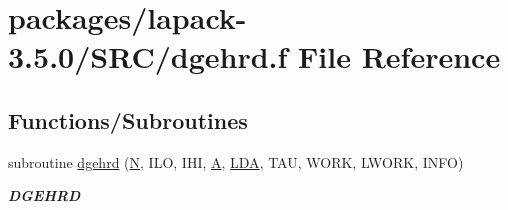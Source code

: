 \hypertarget{dgehrd_8f}{}\section{packages/lapack-\/3.5.0/\+S\+R\+C/dgehrd.f File Reference}
\label{dgehrd_8f}
\subsection*{Functions/\+Subroutines}
\begin{DoxyCompactItemize}
\item 
subroutine \hyperlink{group__doubleGEcomputational_ga2611cc9dfdc84e2a08ec57a5dd6cdd2e}{dgehrd} (\hyperlink{polmisc_8c_a0240ac851181b84ac374872dc5434ee4}{N}, I\+L\+O, I\+H\+I, \hyperlink{classA}{A}, \hyperlink{example__user_8c_ae946da542ce0db94dced19b2ecefd1aa}{L\+D\+A}, T\+A\+U, W\+O\+R\+K, L\+W\+O\+R\+K, I\+N\+F\+O)
\begin{DoxyCompactList}\small\item\em {\bfseries D\+G\+E\+H\+R\+D} \end{DoxyCompactList}\end{DoxyCompactItemize}
